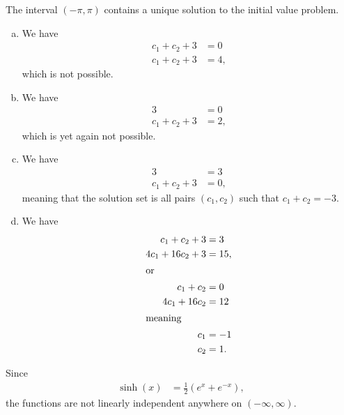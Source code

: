 \documentclass[10pt]{mypackage}
\begin{document}
\begin{solution}[Problem 10]
  The interval $(-\pi,\pi)$ contains a unique solution to the initial value problem.
\end{solution}
\begin{solution}[Problem 14]\hfill
  \begin{enumerate}[(a)]
    \item We have
      \begin{align*}
        c_1 + c_2 + 3 &= 0\\
        c_1 + c_2 + 3 &= 4,
      \end{align*}
      which is not possible.
    \item We have
      \begin{align*}
        3 &= 0\\
        c_1 + c_2 + 3 &= 2,
      \end{align*}
      which is yet again not possible.
    \item We have
      \begin{align*}
        3 &= 3\\
        c_1 + c_2 + 3 &= 0,
      \end{align*}
      meaning that the solution set is all pairs $\left(c_1,c_2\right)$ such that $c_1 + c_2 = -3$.
    \item We have
      \begin{align*}
        c_1 + c_2 + 3 &= 3\\
        4c_1 + 16 c_2 + 3 &= 15,\\
        \intertext{or}
        c_1 + c_2 &= 0\\
        4c_1 + 16 c_2 &= 12\\
        \intertext{meaning}
        c_1 &= -1\\
        c_2 &= 1.
      \end{align*}
  \end{enumerate}
\end{solution}
\begin{solution}[Problem 22]
  Since
  \begin{align*}
    \sinh(x) &= \frac{1}{2}\left(e^{x} + e^{-x}\right),
  \end{align*}
  the functions are not linearly independent anywhere on $\left(-\infty,\infty\right)$.
\end{solution}
\end{document}

